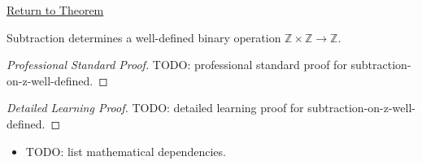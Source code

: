 \newpage
{}
\label{prf:subtraction-on-z-well-defined}

\begin{remark*}[Return]
\hyperref[thm:subtraction-on-z-well-defined]{Return to Theorem}
\end{remark*}

\begin{theorem*}
Subtraction determines a well-defined binary operation
$\mathbb{Z}\times\mathbb{Z}\to\mathbb{Z}$.
\end{theorem*}

\begin{proof}[Professional Standard Proof]
\LRAProofBodyStart
TODO: professional standard proof for subtraction-on-z-well-defined.
\end{proof}

\begin{proof}[Detailed Learning Proof]
\LRAProofBodyStart
TODO: detailed learning proof for subtraction-on-z-well-defined.
\end{proof}

\begin{remark*}
\end{remark*}

\begin{dependencies}
\begin{itemize}
  \item TODO: list mathematical dependencies.
\end{itemize}
\end{dependencies}

\clearpage
